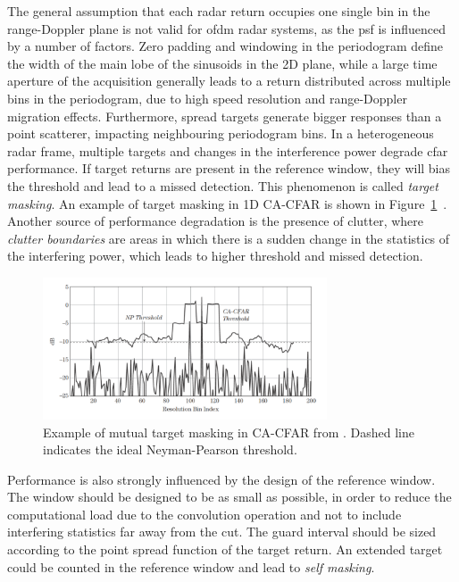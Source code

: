 The general assumption that each radar return occupies one single bin in the range-Doppler plane is not valid for \gls{ofdm} radar systems, as the \gls{psf} is influenced by a number of factors.
Zero padding and windowing in the periodogram define the width of the main lobe of the sinusoids in the 2D plane, while a large time aperture of the acquisition generally leads to a return distributed across multiple bins in the periodogram, due to high speed resolution and range-Doppler migration effects.
Furthermore, spread targets generate bigger responses than a point scatterer, impacting neighbouring periodogram bins.
In a heterogeneous radar frame, multiple targets and changes in the interference power degrade \gls{cfar} performance. If target returns are present in the reference window, they will bias the threshold and lead to a missed detection. This phenomenon is called \textit{target masking}. An example of target masking in 1D CA-CFAR is shown in Figure~\ref{fig:target_masking_richards}~\cite{Richards_Scheer_Holm_2010}.
Another source of performance degradation is the presence of clutter, where \textit{clutter boundaries} are areas in which there is a sudden change in the statistics of the interfering power, which leads to higher threshold and missed detection.
\begin{figure}[b!]
	\centering
	\includegraphics[width=0.75\textwidth]{Images/radar_detect_threshold/target_masking_richards.png}
	\caption{\small Example of mutual target masking in CA-CFAR from \cite{Richards_Scheer_Holm_2010}. Dashed line indicates the ideal Neyman-Pearson threshold.}
	\label{fig:target_masking_richards}
\end{figure}
Performance is also strongly influenced by the design of the reference window. The window should be designed to be as small as possible, in order to reduce the computational load due to the convolution operation and not to include interfering statistics far away from the \gls{cut}. The guard interval should be sized according to the point spread function of the target return. An extended target could be counted in the reference window and lead to \textit{self masking}.
